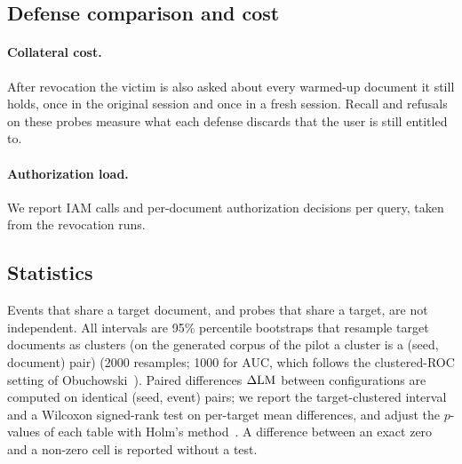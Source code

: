 \subsection{Defense comparison and cost}
\label{sec:method-review}
\paragraph{Collateral cost.}
After revocation the victim is also asked about every warmed-up document it still holds, once in the
original session and once in a fresh session. Recall and refusals on these probes measure what each
defense discards that the user is still entitled to.

\paragraph{Authorization load.}
We report IAM calls and per-document authorization decisions per query, taken from the revocation
runs.

\subsection{Statistics}
Events that share a target document, and probes that share a target, are not independent. All
intervals are 95\% percentile bootstraps that resample target documents as clusters (on the
generated corpus of the pilot a cluster is a (seed, document) pair) (2000 resamples;
1000 for AUC, which follows the clustered-ROC setting of Obuchowski~\cite{obuchowski1997clustered}).
Paired differences $\Delta\mathrm{LM}$ between configurations are computed on identical (seed, event) pairs;
we report the target-clustered interval and a Wilcoxon signed-rank test on per-target mean
differences, and adjust the $p$-values of each table with Holm's method~\cite{holm1979simple}. A
difference between an exact zero and a non-zero cell is reported without a test.
